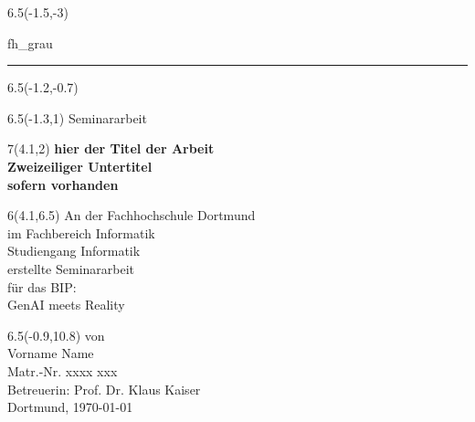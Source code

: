 \documentclass[a4paper,12pt,numbers=noenddot]{scrartcl}
\begin{document}

\begin{titlepage}
	\begin{textblock}{6.5}(-1.5,-3)
		\begin{color}{fh_grau}
			\rule{6.8cm}{33cm}    
		\end{color}
	\end{textblock}
	\begin{textblock}{6.5}(-1.2,-0.7)
	\end{textblock}
	\begin{textblock}{6.5}(-1.3,1)
		{\large \textsf{Seminararbeit}}            
	\end{textblock}
	
	\begin{textblock}{7}(4.1,2)
		{\noindent \huge 
			\textsf{\textbf{hier der Titel der Arbeit\\[0.3cm] 
					\Large  Zweizeiliger Untertitel\\[0.05cm]
					sofern vorhanden}} }
	\end{textblock}
	
	
	\begin{textblock}{6}(4.1,6.5)\noindent
		\textsf{An der Fachhochschule Dortmund\\
			im Fachbereich Informatik\\
			Studiengang Informatik \\
			erstellte Seminararbeit \\
			für das BIP:\\
			GenAI meets Reality}
	\end{textblock}
	
	\begin{textblock}{6.5}(-0.9,10.8)
		\noindent
		\textsf{von \\
			Vorname Name \\
			Matr.-Nr. xxxx xxx\\[0.7cm]
			Betreuerin: Prof. Dr. Klaus Kaiser \\[0.5cm]
			Dortmund, \today}    
	\end{textblock}
	
\end{titlepage}
\end{document}
